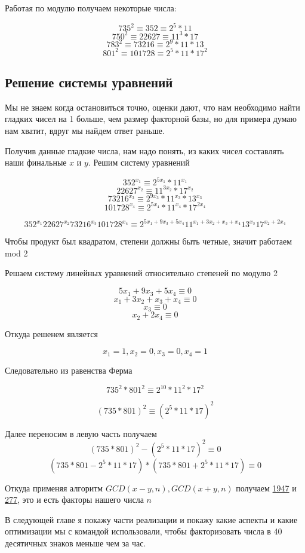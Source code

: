 Работая по модулю получаем некоторые числа:

$$
735^2 \equiv 352 \equiv 2^5 * 11
$$
$$
750^2 \equiv 22627 \equiv 11^3 * 17
$$
$$
783^2 \equiv 73216 \equiv 2^9 * 11 * 13
$$
$$
801^2 \equiv 101728 \equiv 2^5 * 11 * 17^2
$$

\subsection{Решение системы уравнений}

Мы не знаем когда остановиться точно, оценки дают, что нам необходимо найти гладких чисел на 1 больше, чем размер факторной базы, но для примера думаю нам хватит, вдруг мы найдем ответ раньше.

Получив данные гладкие числа, нам надо понять, из каких чисел составлять наши финальные $x$ и $y$. Решим систему уравнений

$$
352^{x_1} \equiv 2^{5x_1} * 11^{x_1}
$$
$$
22627^{x_2} \equiv 11^{3x_2} * 17^{x_2}
$$
$$
73216^{x_3} \equiv 2^{9x_3} * 11^{x_3} * 13^{x_3}
$$
$$
101728^{x_4} \equiv 2^{5x_4} * 11^{x_4} * 17^{2x_4}
$$

$$
352^{x_1}22627^{x_2}73216^{x_3}101728^{x_4} \equiv 
2^{5x_1+9x_3+5x_4} 11^{x_1+3x_2+x_3+x_4} 13^{x_3} 17^{x_2+2x_4}
$$

Чтобы продукт был квадратом, степени должны быть четные, значит работаем mod 2

Решаем систему линейных уравнений относительно степеней по модулю 2

$$
5x_1+9x_3+5x_4 \equiv 0
$$
$$
x_1+3x_2+x_3+x_4 \equiv 0
$$
$$
x_3 \equiv 0
$$
$$
x_2+2x_4 \equiv 0
$$

Откуда решенем является

$$
x_1 = 1, x_2 = 0, x_3 = 0, x_4 = 1
$$

Следовательно из равенства Ферма

$$
735^2*801^2 \equiv 2^10 * 11^2 * 17^2
$$

$$
(735*801)^2 \equiv (2^5 * 11 * 17)^2
$$

Далее переносим в левую часть получаем
$$
(735*801)^2 - (2^5 * 11 * 17)^2 \equiv 0
$$
$$
(735*801 - 2^5 * 11 * 17) * (735*801 + 2^5 * 11 * 17) \equiv 0
$$

Откуда применяя алгоритм $GCD(x-y,n), GCD(x+y,n)$ получаем \underline{1947} и \underline{277}, это и есть факторы нашего числа $n$

В следующей главе я покажу части реализации и покажу какие аспекты и какие оптимизации мы с командой использовали, чтобы факторизовать числа в 40 десятичных знаков меньше чем за час.

